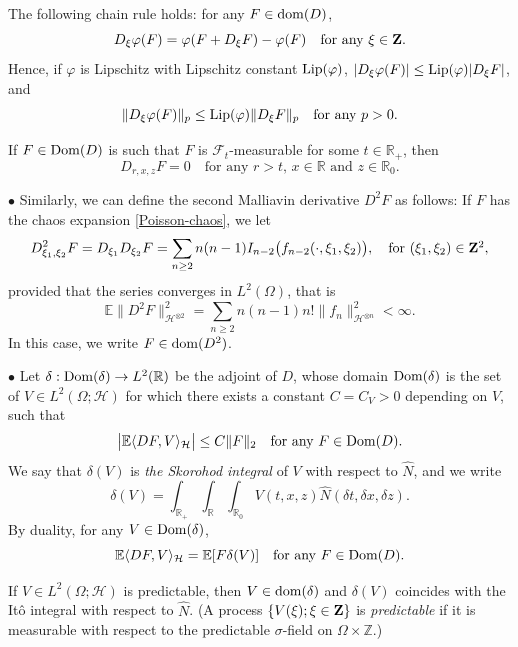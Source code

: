 \documentclass[12pt]{article}
\def\cF{\mathcal{F}}
\def\cH{\mathcal{H}}
\def\bE{\mathbb{E}}
\def\bR{\mathbb{R}}
\def\bZ{\mathbb{Z}}
\begin{document}
The following chain rule holds: for any $F \in {\rm dom}(D)$,
\[
D_{\xi}\varphi(F) =\varphi(F+D_{\xi}F)-\varphi(F) \quad \mbox{for any $\xi \in {\bf Z}$}.
\]
Hence, if $\varphi$ is Lipschitz with Lipschitz constant ${\rm Lip}(\varphi)$, 
$|D_{\xi}\varphi(F)| \leq {\rm Lip}(\varphi)|D_{\xi}F|$, and
\begin{equation}
\label{chain1}
\|D_{\xi}\varphi(F)\|_p \leq {\rm Lip}(\varphi)\|D_{\xi}F\|_p \quad \mbox{for any $p>0$}.
\end{equation}

If $F \in {\rm Dom}(D)$ is such that $F$ is $\cF_t$-measurable for some $t \in \bR_{+}$, then 
\[
D_{r,x,z}F=0 \quad \mbox{for any $r>t$, $x \in \bR$ and $z \in \bR_0$}.
\]

$\bullet$
Similarly, we can define the second Malliavin derivative $D^2 F$ as follows:
If $F$ has the chaos expansion \eqref{Poisson-chaos}, we let
\begin{align*}
D^2_{\xi_1,\xi_2} F = D_{\xi_1} D_{\xi_2} F
= \sum_{n \geq 2} n(n-1) I_{n-2}\big( f_{n-2}(\cdot,\xi_1, \xi_2 )\big), \quad \mbox{for $(\xi_1,\xi_2) \in {\bf Z}^2$},
\end{align*}
provided that the series converges in $L^2(\Omega)$, that is
\begin{equation}
\label{check-D2}
\bE\|D^2F\|_{\cH^{\otimes 2}}^2=\sum_{n \geq 2} n(n-1) n! \| f_n \|^2_{\cH^{\otimes n}} < \infty.
\end{equation}
In this case, we write $F \in {\rm dom}(D^2)$.

\medskip

$\bullet$
 Let $\delta:{\rm Dom}(\delta) \to L^2(\bR)$ be the adjoint of $D$, whose domain ${\rm Dom}(\delta)$ is the set of $V \in L^2(\Omega;\cH)$ for which there exists a constant $C=C_V>0$ depending on $V$, such that 
\[
\big|\bE \langle DF,V \rangle_{\cH}\big| \leq C \|F\|_2 \quad \mbox{for any $F \in {\rm Dom}(D)$}.
\] 
We say that $\delta(V)$ is 
{\em the Skorohod integral} of $V$ with respect to $\widehat{N}$, and we write
\[
\delta(V)=\int_{\bR_{+}}\int_{\bR} \int_{\bR_0}V(t,x,z)\widehat{N}(\delta t, \delta x, \delta z).
\]
By duality, for any $V \in {\rm Dom}(\delta)$,
\[
\bE\langle DF,V \rangle_{\cH}=\bE[F \delta(V)] \quad \mbox{for any $F \in {\rm Dom}(D)$}.
\]


If $V \in L^2(\Omega;\cH)$ is predictable, then $V \in {\rm dom}(\delta)$ and $\delta(V)$ coincides with the It\^o integral with respect to $\widehat{N}$. (A process $\{V(\xi);\xi \in {\bf Z}\}$ is {\em predictable} if it is measurable with respect to the predictable $\sigma$-field on $\Omega \times {\bZ}$.)
\end{document}

